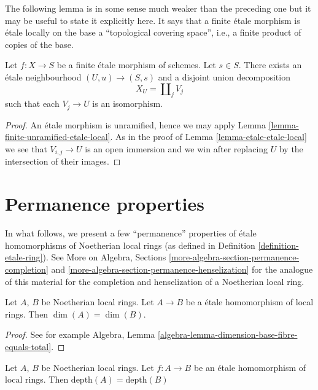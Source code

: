 \noindent
The following lemma is in some sense much weaker than the preceding one
but it may be useful to state it explicitly here. It says that a finite
\'etale morphism is \'etale locally on the base a
``topological covering space'', i.e., a finite product of copies of the base.

\begin{lemma}
\label{lemma-finite-etale-etale-local}
Let $f : X \to S$ be a finite \'etale morphism of schemes.
Let $s \in S$. There exists an \'etale neighbourhood $(U, u) \to (S, s)$
and a disjoint union decomposition
$$
X_U = \coprod\nolimits_j V_j
$$
such that each $V_j \to U$ is an isomorphism.
\end{lemma}

\begin{proof}
An \'etale morphism is unramified, hence we may apply
Lemma \ref{lemma-finite-unramified-etale-local}.
As in the proof of
Lemma \ref{lemma-etale-etale-local}
we see that $V_{i, j} \to U$ is an open immersion and we win
after replacing $U$ by the intersection of their images.
\end{proof}




\section{Permanence properties}
\label{section-properties-permanence}

\noindent
In what follows, we present a few ``permanence''
properties of \'etale homomorphisms of Noetherian local rings
(as defined in Definition \ref{definition-etale-ring}). See
More on Algebra, Sections \ref{more-algebra-section-permanence-completion} and
\ref{more-algebra-section-permanence-henselization}
for the analogue of this material for the completion and
henselization of a Noetherian local ring.

\begin{lemma}
\label{lemma-etale-dimension}
Let $A$, $B$ be Noetherian local rings.
Let $A \to B$ be a \'etale homomorphism of local rings.
Then $\dim(A) = \dim(B)$.
\end{lemma}

\begin{proof}
See for example
Algebra, Lemma \ref{algebra-lemma-dimension-base-fibre-equals-total}.
\end{proof}

\begin{proposition}
\label{proposition-etale-depth}
Let $A$, $B$ be Noetherian local rings.
Let $f : A \to B$ be an \'etale homomorphism of local rings.
Then $\text{depth}(A) = \text{depth}(B)$
\end{proposition}

